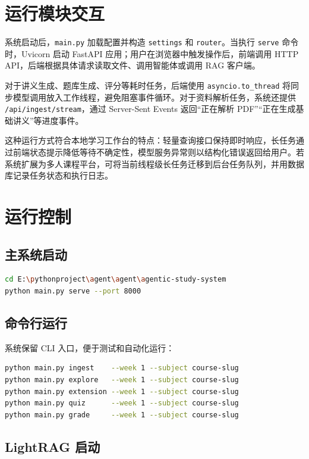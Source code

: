 \documentclass[UTF8,fontset=windows,zihao=-4,openany]{ctexrep}
\begin{document}
\section{运行模块交互}

系统启动后，\texttt{main.py} 加载配置并构造 \texttt{settings} 和 \texttt{router}。当执行 \texttt{serve} 命令时，Uvicorn 启动 FastAPI 应用；用户在浏览器中触发操作后，前端调用 HTTP API，后端根据具体请求读取文件、调用智能体或调用 RAG 客户端。

对于讲义生成、题库生成、评分等耗时任务，后端使用 \texttt{asyncio.to\_thread} 将同步模型调用放入工作线程，避免阻塞事件循环。对于资料解析任务，系统还提供 \texttt{/api/ingest/stream}，通过 Server-Sent Events 返回“正在解析 PDF”“正在生成基础讲义”等进度事件。

这种运行方式符合本地学习工作台的特点：轻量查询接口保持即时响应，长任务通过前端状态提示降低等待不确定性，模型服务异常则以结构化错误返回给用户。若系统扩展为多人课程平台，可将当前线程级长任务迁移到后台任务队列，并用数据库记录任务状态和执行日志。

\section{运行控制}

\subsection{主系统启动}

\begin{lstlisting}[language=bash]
cd E:\pythonproject\agent\agent\agentic-study-system
python main.py serve --port 8000
\end{lstlisting}

\subsection{命令行运行}

系统保留 CLI 入口，便于测试和自动化运行：
\begin{lstlisting}[language=bash]
python main.py ingest    --week 1 --subject course-slug
python main.py explore   --week 1 --subject course-slug
python main.py extension --week 1 --subject course-slug
python main.py quiz      --week 1 --subject course-slug
python main.py grade     --week 1 --subject course-slug
\end{lstlisting}

\subsection{LightRAG 启动}
\end{document}
